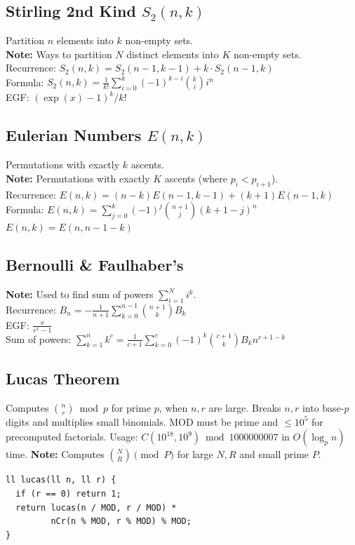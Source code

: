 \subsection{Stirling 2nd Kind $S_2(n,k)$}
Partition $n$ elements into $k$ non-empty sets. \\
\textbf{Note:} Ways to partition $N$ distinct elements into $K$ non-empty sets. \\
\textbullet{} Recurrence: $S_2(n,k) = S_2(n-1,k-1) + k \cdot S_2(n-1,k)$ \\
\textbullet{} Formula: $S_2(n,k) = \frac{1}{k!} \sum_{i=0}^k (-1)^{k-i} \binom{k}{i} i^n$ \\
\textbullet{} EGF: $(\exp(x)-1)^k / k!$

\subsection{Eulerian Numbers $E(n,k)$}
Permutations with exactly $k$ ascents. \\
\textbf{Note:} Permutations with exactly $K$ ascents (where $p_i < p_{i+1}$). \\
\textbullet{} Recurrence: $E(n,k) = (n-k)E(n-1,k-1) + (k+1)E(n-1,k)$ \\
\textbullet{} Formula: $E(n,k) = \sum_{j=0}^k (-1)^j \binom{n+1}{j} (k+1-j)^n$ \\
\textbullet{} $E(n,k) = E(n, n-1-k)$

\subsection{Bernoulli \& Faulhaber's}
\textbf{Note:} Used to find sum of powers $\sum_{i=1}^N i^k$. \\
\textbullet{} Recurrence: $B_n = -\frac{1}{n+1} \sum_{k=0}^{n-1} \binom{n+1}{k} B_k$ \\
\textbullet{} EGF: $\frac{x}{e^x-1}$ \\
\textbullet{} Sum of powers:
$\sum_{k=1}^n k^c = \frac{1}{c+1} \sum_{k=0}^c (-1)^k \binom{c+1}{k} B_k n^{c+1-k}$
\subsection{Lucas Theorem}
Computes $\binom{n}{r} \bmod p$ for prime $p$, when $n, r$ are large. Breaks $n, r$ into base-$p$ digits and multiplies small binomials. MOD must be prime and $\le 10^5$ for precomputed factorials. Usage: $C(10^{18}, 10^9) \bmod 1000000007$ in $O(\log_p n)$ time.
\textbf{Note:} Computes $\binom{N}{R} \pmod P$ for large $N, R$ and small prime $P$.
\begin{verbatim}
ll lucas(ll n, ll r) {
  if (r == 0) return 1;
  return lucas(n / MOD, r / MOD) *
         nCr(n % MOD, r % MOD) % MOD;
}
\end{verbatim}
